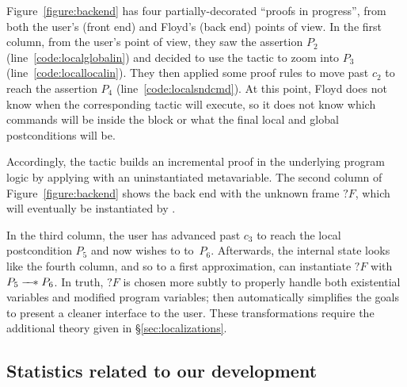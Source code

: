 Figure~\ref{figure:backend} has four partially-decorated ``proofs in progress'', from both the user's (front end) and Floyd's (back end) points of view.  In the first column, from the user's point of view, they saw the assertion $P_2$ (line~\ref{code:localglobalin}) and decided to use the  tactic to zoom into $P_3$ (line~\ref{code:locallocalin}).  They then applied some proof rules to move past $c_2$ to reach the assertion $P_4$ (line~\ref{code:localsndcmd}).  At this point, Floyd does not know when the corresponding  tactic will execute, so it does not know which commands will be inside the block or what the final local and global postconditions will be.

Accordingly, the  tactic builds an incremental proof in the underlying program logic by applying  with an uninstantiated metavariable.
The second column of Figure~\ref{figure:backend} shows the back end with the unknown frame $?F$, which will eventually be instantiated by .

In the third column, the user has advanced past $c_3$ to reach the local postcondition $P_5$ and now wishes to  to~$P_6$.  Afterwards, the internal state looks like the fourth column, and so to a first approximation,  can instantiate $?F$ with $P_5 \mathrel{\mbox{$\hspace*{-0.03em}\mathord{-}\hspace*{-0.4em} \mathord{-}\hspace*{-0.13em} \mathord{\mathbin{\ast}}$\hspace*{-0.005em}}} P_6$.  In truth, $?F$ is chosen more subtly to properly handle both existential variables and modified program variables;  then automatically simplifies the goals to present a cleaner interface to the user.  These transformations require the additional theory given in \S\ref{sec:localizations}.

\subsection{Statistics related to our development}

